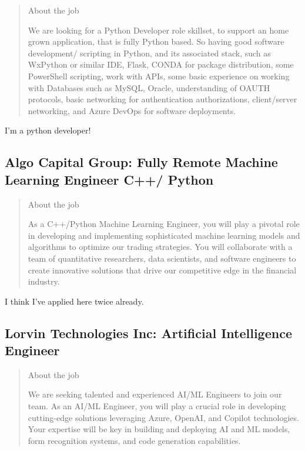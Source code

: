 \documentclass[
	letterpaper, %
	12pt, %
]{CSSullivanBusinessReport}
\begin{document}
\begin{quote}
	About the job
	
	We are looking for a Python Developer role skillset, to support an home grown application, that is fully Python based. So having good software development/ scripting in Python, and its associated stack, such as WxPython or similar IDE, Flask, CONDA for package distribution, some PowerShell scripting, work with APIs, some basic experience on working with Databases such as MySQL, Oracle, understanding of OAUTH protocols, basic networking for authentication authorizations, client/server networking, and Azure DevOps for software deployments.

\end{quote}

I'm a python developer!


\subsection[Algo Capital Group]{Algo Capital Group: Fully Remote Machine Learning Engineer C++/ Python }

\begin{quote}
	About the job
	
	As a C++/Python Machine Learning Engineer, you will play a pivotal role in developing and implementing sophisticated machine learning models and algorithms to optimize our trading strategies. You will collaborate with a team of quantitative researchers, data scientists, and software engineers to create innovative solutions that drive our competitive edge in the financial industry.

\end{quote}

I think I've applied here twice already.


\subsection[Lorvin Technologies Inc]{Lorvin Technologies Inc: Artificial Intelligence Engineer}

\begin{quote}
	About the job
	
	We are seeking talented and experienced AI/ML Engineers to join our team. As an AI/ML Engineer, you will play a crucial role in developing cutting-edge solutions leveraging Azure, OpenAI, and Copilot technologies. Your expertise will be key in building and deploying AI and ML models, form recognition systems, and code generation capabilities.

\end{quote}
\end{document}

